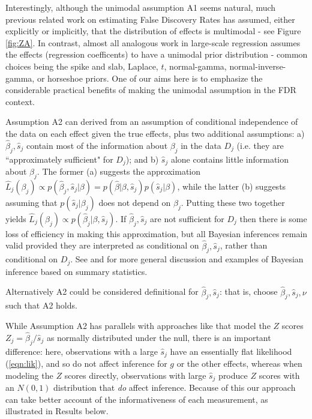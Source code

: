 \documentclass[11pt]{article}
\def\bhat{\hat{\beta}}
\def\shat{\hat{s}}
\begin{document}
Interestingly, although the unimodal assumption A1 seems natural, much previous related work on estimating False Discovery Rates  
has assumed, either explicitly or implicitly, that the distribution of effects is multimodal - see Figure \ref{fig:ZA}. 
In contrast, almost all analogous work in large-scale regression assumes the effects (regression coefficents) to have a unimodal prior distribution - 
common choices being the spike and slab, Laplace, $t$, normal-gamma, normal-inverse-gamma, or horseshoe priors.
One of our aims here is to emphasize the considerable practical benefits of making the unimodal assumption in the FDR context.

Assumption A2 can derived from an assumption of conditional independence of the data on each effect given the true effects, plus two additional assumptions: a) $\bhat_j, \shat_j$ contain most of the information about $\beta_j$ in the data $D_j$ (i.e. they are ``approximately sufficient" for $D_j$); and b) $\shat_j$ alone contains little information about $\beta_j$. The former (a) suggests the approximation $\hat{L}_j(\beta_j) \propto p(\bhat_j, \shat_j | \beta) = p(\bhat | \beta, \shat_j) p(\shat_j | \beta)$, while the latter (b) suggests assuming that $p(\shat_j|\beta_j)$ does not depend on $\beta_j$. Putting these two together yields $\hat{L}_j(\beta_j) \propto p(\bhat_j | \beta, \shat_j)$. If $\bhat_j, \shat_j$ are not sufficient for $D_j$ then there is some loss of efficiency in making this approximation, but all Bayesian inferences remain valid provided they are interpreted as conditional on $\bhat_j,\shat_j$, rather than conditional on $D_j$. See \cite{johnson:2008} and \cite{wakefield:2009} for more general discussion and examples of Bayesian inference based on summary statistics. 

Alternatively A2 could be considered definitional for $\bhat_j,\shat_j$: that is, choose $\bhat_j,\shat_j,\nu$ such that A2 holds. 

While Assumption A2 has parallels with approaches like \cite{efron2008microarrays, sun2007oracle}
 that model the $Z$ scores $Z_j = \bhat_j/\shat_j$ as normally distributed under the null, 
there is an important difference: here, observations with a large $\shat_j$ have an essentially flat likelihood (\ref{eqn:lik}), and so do not affect inference for
$g$ or the other effects, whereas when modeling the $Z$ scores directly, observations with large $\shat_j$ produce $Z$ scores with an $N(0,1)$ distribution that {\it do} affect inference.  Because of this our approach can take better account of the informativeness of each measurement, as illustrated in Results below.
\end{document}

